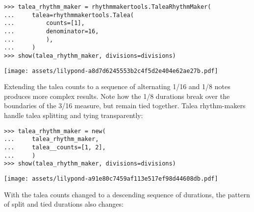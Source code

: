 \begin{comment}
<abjad>
talea_rhythm_maker = rhythmmakertools.TaleaRhythmMaker(
    talea=rhythmmakertools.Talea(
        counts=[1],
        denominator=16,
        ),
    )
show(talea_rhythm_maker, divisions=divisions)
</abjad>
\end{comment}

\begin{singlespacing}
\vspace{-0.5\baselineskip}
\begin{lstlisting}
>>> talea_rhythm_maker = rhythmmakertools.TaleaRhythmMaker(
...     talea=rhythmmakertools.Talea(
...         counts=[1],
...         denominator=16,
...         ),
...     )
>>> show(talea_rhythm_maker, divisions=divisions)
\end{lstlisting}
\noindent\texttt{[image: assets/lilypond-a8d7d6245553b2c4f5d2e404e62ae27b.pdf]}
\end{singlespacing}

\noindent Extending the talea counts to a sequence of alternating 1/16 and 1/8
notes produces more complex results. Note how the 1/8 durations break over the
boundaries of the 3/16 measure, but remain tied together. Talea rhythm-makers
handle talea splitting and tying transparently:

\begin{comment}
<abjad>
talea_rhythm_maker = new(
    talea_rhythm_maker,
    talea__counts=[1, 2],
    )
show(talea_rhythm_maker, divisions=divisions)
</abjad>
\end{comment}

\begin{singlespacing}
\vspace{-0.5\baselineskip}
\begin{lstlisting}
>>> talea_rhythm_maker = new(
...     talea_rhythm_maker,
...     talea__counts=[1, 2],
...     )
>>> show(talea_rhythm_maker, divisions=divisions)
\end{lstlisting}
\noindent\texttt{[image: assets/lilypond-a91e80c7459af113e517ef98d44608db.pdf]}
\end{singlespacing}

\noindent With the talea counts changed to a descending sequence of durations,
the pattern of split and tied durations also changes:

\begin{comment}
<abjad>
talea_rhythm_maker = new(
    talea_rhythm_maker,
    talea__counts=[4, 3, 2, 1],
    )
show(talea_rhythm_maker, divisions=divisions)
</abjad>
\end{comment}

